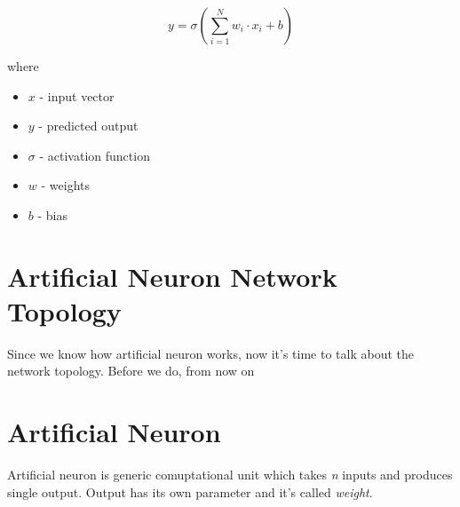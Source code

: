 \[ y = \sigma(\sum_{i=1}^N w_i \cdot x_i + b) \]

where

\begin{itemize}
	\item $x$ - input vector
	\item $y$ - predicted output
  \item $\sigma$ - activation function
	\item $w$ - weights
	\item $b$ - bias
\end{itemize}



\section{Artificial Neuron Network Topology}

Since we know how artificial neuron works, now it's time to talk about the network topology. Before we do, from now on



\section{Artificial Neuron}

Artificial neuron is generic comuptational unit which takes \textit{n} inputs and produces single output.
Output has its own parameter and it's called \textit{weight}.
